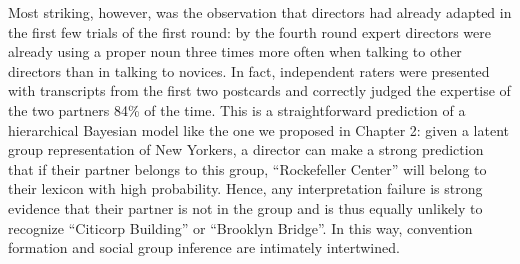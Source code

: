 Most striking, however, was the observation that directors had already adapted in the first few trials of the first round: by the fourth round expert directors were already using a proper noun three times more often when talking to other directors than in talking to novices. In fact, independent raters were presented with transcripts from the first two postcards and correctly judged the expertise of the two partners 84\% of the time. This is a straightforward prediction of a hierarchical Bayesian model like the one we proposed in Chapter 2: given a latent group representation of New Yorkers, a director can make a strong prediction that if their partner belongs to this group, ``Rockefeller Center'' will belong to their lexicon with high probability. Hence, any interpretation failure is strong evidence that their partner is not in the group and is thus equally unlikely to recognize ``Citicorp Building'' or ``Brooklyn Bridge''. In this way, convention formation and social group inference are intimately intertwined. 


